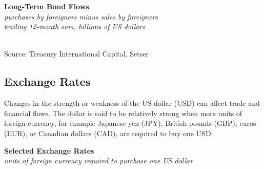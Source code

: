 \documentclass{report}
\makeatletter
\newcommand{\tbllink}[1]{\href{https://raw.githubusercontent.com/bdecon/US-chartbook/master/chartbook/data/#1}{\faTable}}
\newcommand*\short[1]{\expandafter\@gobbletwo\number\numexpr#1\relax}
\newcommand{\ctsbar}[5]{
		\addplot[ybar stacked, bar width=#5, draw opacity=0, fill=#1] 
			table [x=#2, y=#3, col sep=comma]{#4};}
\newcommand{\dateaxisticks}{
		date coordinates in=x, axis line style={draw=none},
		xmax={2024-01-31},
		max space between ticks=40,	    
		xtick={{1990-01-01}, {1992-01-01}, {1994-01-01}, 
			{1996-01-01}, {1998-01-01}, {2000-01-01}, 
			{2002-01-01}, {2004-01-01}, {2006-01-01},
			{2008-01-01}, {2010-01-01}, {2012-01-01}, {2014-01-01},
		    {2016-01-01}, {2018-01-01}, {2020-01-01}, {2022-01-01}, 
		    {2024-01-01}, {2026-01-01}},
		minor xtick={{1989-01-01}, {1991-01-01}, {1993-01-01},
			{1995-01-01}, {1997-01-01}, {1999-01-01}, 
			{2001-01-01}, {2003-01-01}, {2005-01-01}, {2007-01-01},
		    {2009-01-01}, {2011-01-01}, {2013-01-01}, {2015-01-01},
		    {2017-01-01}, {2019-01-01}, {2021-01-01}, {2023-01-01}, 
		    {2025-01-01}, {2027-01-01}},
		enlarge y limits={0.06}, enlarge x limits={0.01},
		xticklabel style={align=center, yshift=-2pt}, tick label style={inner sep=0pt},
		}
\newcommand{\bbar}[2]{extra #1 ticks = {{#2}}, extra #1 tick labels = ,
		extra #1 tick style = {grid=major, grid style={thick, black!25}},}
\newcommand{\rbars}{
		\fill[color=black!10] (axis cs:{1990-07-01},\pgfkeysvalueof{/pgfplots/ymin})
			rectangle (axis cs:{1991-03-01}, \pgfkeysvalueof{/pgfplots/ymax});
		\fill[color=black!10] (axis cs:{2007-12-01},\pgfkeysvalueof{/pgfplots/ymin})
			rectangle (axis cs:{2009-07-01}, \pgfkeysvalueof{/pgfplots/ymax});
		\fill[color=black!10] (axis cs:{2001-03-01},\pgfkeysvalueof{/pgfplots/ymin})
			rectangle (axis cs:{2001-11-01}, \pgfkeysvalueof{/pgfplots/ymax});
		\fill[color=black!10] (axis cs:{2020-02-01},\pgfkeysvalueof{/pgfplots/ymin})
			rectangle (axis cs:{2020-05-01}, \pgfkeysvalueof{/pgfplots/ymax});}
\makeatother
\begin{document}
{\begin{minipage}{1.0\textwidth}

\vspace{1mm}

\normalsize \textbf{Long-Term Bond Flows}\\
\footnotesize{\textit{purchases by foreigners minus sales by foreigners}}\\\footnotesize{\textit{trailing 12-month sum, billions of US dollars}}\\
\hspace*{-2mm} \\
\footnotesize{Source: Treasury International Capital, Setser} \hfill \tbllink{tic_bond.csv}
\end{minipage}
\newpage
\hypertarget{extfx}{\label{extfx}}
\begin{minipage}{1.0\textwidth}
\subsection*{Exchange Rates}
       
\small Changes in the strength or weakness of the US dollar (USD) can affect trade and financial flows. The dollar is said to be relatively strong when more units of foreign currency, for example Japanese yen (JPY), British pounds (GBP), euros (EUR), or Canadian dollars (CAD), are required to buy one USD.


\vspace{0.5mm}

\normalsize \textbf{Selected Exchange Rates}\\
\footnotesize{\textit{units of foreign currency required to purchase one US dollar}}
\vspace{3.5cm}


\end{minipage}}
\end{document}
